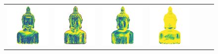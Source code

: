 \begin{figure}
\begin{tabular*}{\linewidth}{@{}c@{}c@{}c@{}c@{}c@{}c@{}c@{}}
\includegraphics[width=\reswidth\linewidth]{figures/results/examples/yu_buddha_errors.png} &
\includegraphics[width=\reswidth\linewidth]{figures/results/examples/dpsn_buddha_errors.png} &
\includegraphics[width=\reswidth\linewidth]{figures/results/examples/marrnet_buddha_errors.png} &
\includegraphics[width=\reswidth\linewidth]{figures/results/examples/ef_buddha_errors.png} \\

\end{tabular*}
\end{figure}

